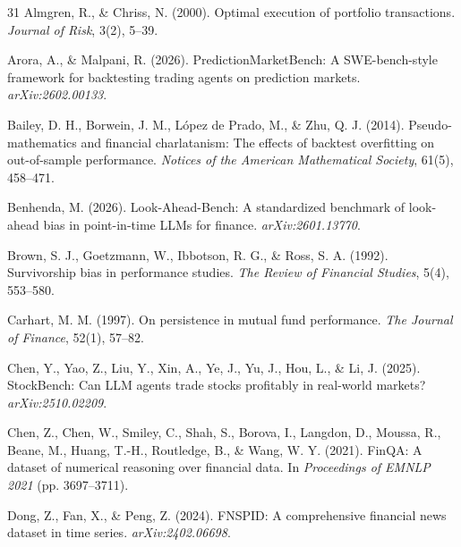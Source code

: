 \documentclass{article}
\begin{document}
\begin{ack}



\end{ack}

\begin{thebibliography}{31}
Almgren, R., \& Chriss, N. (2000). Optimal execution of portfolio transactions. \textit{Journal of Risk}, 3(2), 5--39.

Arora, A., \& Malpani, R. (2026). PredictionMarketBench: A SWE-bench-style framework for backtesting trading agents on prediction markets. \textit{arXiv:2602.00133}.

Bailey, D. H., Borwein, J. M., L\'{o}pez de Prado, M., \& Zhu, Q. J. (2014). Pseudo-mathematics and financial charlatanism: The effects of backtest overfitting on out-of-sample performance. \textit{Notices of the American Mathematical Society}, 61(5), 458--471.

Benhenda, M. (2026). Look-Ahead-Bench: A standardized benchmark of look-ahead bias in point-in-time LLMs for finance. \textit{arXiv:2601.13770}.

Brown, S. J., Goetzmann, W., Ibbotson, R. G., \& Ross, S. A. (1992). Survivorship bias in performance studies. \textit{The Review of Financial Studies}, 5(4), 553--580.

Carhart, M. M. (1997). On persistence in mutual fund performance. \textit{The Journal of Finance}, 52(1), 57--82.

Chen, Y., Yao, Z., Liu, Y., Xin, A., Ye, J., Yu, J., Hou, L., \& Li, J. (2025). StockBench: Can LLM agents trade stocks profitably in real-world markets? \textit{arXiv:2510.02209}.

Chen, Z., Chen, W., Smiley, C., Shah, S., Borova, I., Langdon, D., Moussa, R., Beane, M., Huang, T.-H., Routledge, B., \& Wang, W. Y. (2021). FinQA: A dataset of numerical reasoning over financial data. In \textit{Proceedings of EMNLP 2021} (pp. 3697--3711).

Dong, Z., Fan, X., \& Peng, Z. (2024). FNSPID: A comprehensive financial news dataset in time series. \textit{arXiv:2402.06698}.


\end{thebibliography}
\end{document}
